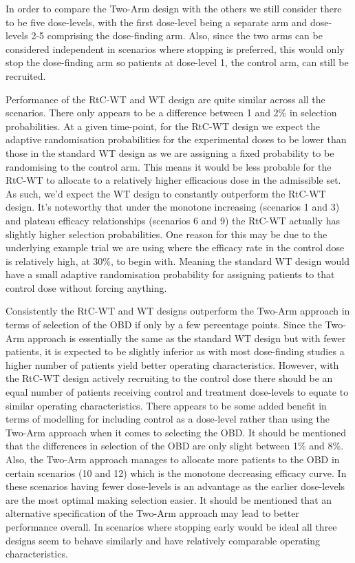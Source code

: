 In order to compare the Two-Arm design with the others we still consider there to be five dose-levels, with the first dose-level being a separate arm and dose-levels 2-5 comprising the dose-finding arm. Also, since the two arms can be considered independent in scenarios where stopping is preferred, this would only stop the dose-finding arm so patients at dose-level 1, the control arm, can still be recruited.   

Performance of the RtC-WT and WT design are quite similar across all the scenarios. There only appears to be a difference between 1 and 2\% in selection probabilities. At a given time-point, for the RtC-WT design we expect the adaptive randomisation probabilities for the experimental doses to be lower than those in the standard WT design as we are assigning a fixed probability to be randomising to the control arm. This means it would be less probable for the RtC-WT to allocate to a relatively higher efficacious dose in the admissible set. As such, we'd expect the WT design to constantly outperform the RtC-WT design. It's noteworthy that under the monotone increasing (scenarios 1 and 3) and plateau efficacy relationships (scenarios 6 and 9) the RtC-WT actually has slightly higher selection probabilities. One reason for this may be due to the underlying example trial we are using where the efficacy rate in the control dose is relatively high, at 30\%, to begin with. Meaning the standard WT design would have a small adaptive randomisation probability for assigning patients to that control dose without forcing anything. 

Consistently the RtC-WT and WT designs outperform the Two-Arm approach in terms of selection of the OBD if only by a few percentage points. Since the Two-Arm approach is essentially the same as the standard WT design but with fewer patients, it is expected to be slightly inferior as with most dose-finding studies a higher number of patients yield better operating characteristics. However, with the RtC-WT design actively recruiting to the control dose there should be an equal number of patients receiving control and treatment dose-levels to equate to similar operating characteristics. There appears to be some added benefit in terms of modelling for including control as a dose-level rather than using the Two-Arm approach when it comes to selecting the OBD. It should be mentioned that the differences in selection of the OBD are only slight between 1\% and 8\%. Also, the Two-Arm approach manages to allocate more patients to the OBD in certain scenarios (10 and 12) which is the monotone decreasing efficacy curve. In these scenarios having fewer dose-levels is an advantage as the earlier dose-levels are the most optimal making selection easier. It should be mentioned that an alternative specification of the Two-Arm approach may lead to better performance overall. In scenarios where stopping early would be ideal all three designs seem to behave similarly and have relatively comparable operating characteristics. 

